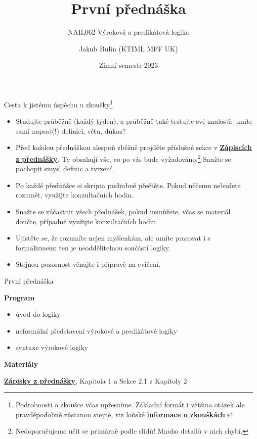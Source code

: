 \documentclass{beamer}
\title{První přednáška}
\subtitle{NAIL062 Výroková a predikátová logika}
\author{Jakub Bulín (KTIML MFF UK)}
\date{Zimní semestr 2023}
\begin{document}
\frame{\titlepage}


\begin{frame}{Cesta k jistému úspěchu u zkoušky\footnote{Podrobnosti o zkoušce včas upřesníme. Základní formát i většina otázek ale pravděpodobně zůstanou stejné, viz loňské \href{https://jbulin.github.io/teaching/fall/nail062/files/info-o-zkouskach.pdf}{\alert{\textbf{informace o zkouškách}}}.}}

\begin{itemize}    
    \item Studujte \alert{průběžně (každý týden)}, a průběžně také \alert{testujte své znalosti}: umíte sami \alert{napsat}(!) definici, větu, důkaz?
    \item Před každou přednáškou alespoň zběžně projděte příslušné sekce v \href{https://github.com/jbulin-mff-uk/nail062/raw/main/lecture/lecture-notes/lecture-notes.pdf}{\alert{\textbf{Zápiscích z přednášky}}}. Ty obsahují vše, co po vás bude vyžadováno.\footnote{Nedoporučujeme učit se primárně podle slidů! Mnoho detailů v nich chybí.} Snažte se pochopit smysl definic a tvrzení.
    \item Po každé přednášce si skripta \alert{podrobně přečtěte}. Pokud něčemu nebudete rozumět, využijte konzultačních hodin.
    \item Snažte se zúčastnit všech přednášek, pokud nemůžete, včas se materiál doučte, případně využijte konzultačních hodin.
    \item Ujistěte se, že rozumíte nejen myšlenkám, ale umíte pracovat i s \alert{formalizmem}: ten je neoddělitelnou součástí logiky.
    \item Stejnou pozornost věnujte i přípravě na \alert{cvičení}.
    \bigskip
\end{itemize}

\end{frame}


\begin{frame}{První přednáška}

    \textbf{Program}
        \begin{itemize}
            \item úvod do logiky
            \item neformální představení výrokové a predikátové logiky
            \item syntaxe výrokové logiky
        \end{itemize}        

    \textbf{Materiály}

        \href{https://github.com/jbulin-mff-uk/nail062/raw/main/lecture/lecture-notes/lecture-notes.pdf}{\alert{\textbf{Zápisky z přednášky}}}, Kapitola 1 a Sekce 2.1 z Kapitoly 2

\end{frame}
\end{document}
